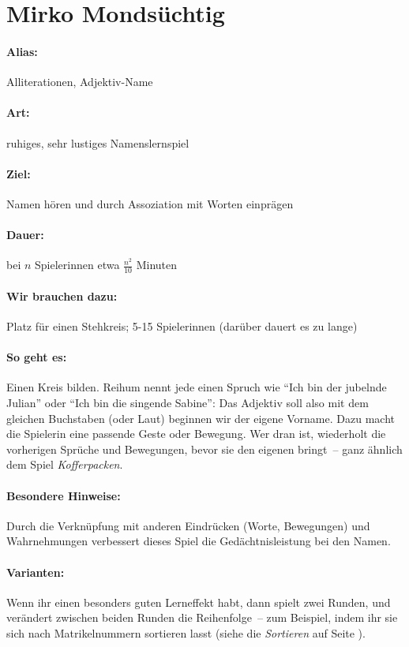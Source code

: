 \section{Mirko Mondsüchtig}
\label{mirko}
\paragraph{Alias:} Alliterationen, Adjektiv-Name
\paragraph{Art:} ruhiges, sehr lustiges Namenslernspiel
\paragraph{Ziel:} Namen hören und durch Assoziation mit Worten einprägen
\paragraph{Dauer:} bei $n$ Spielerinnen etwa $\frac{n^2}{10}$ Minuten
\paragraph{Wir brauchen dazu:} Platz für einen Stehkreis; 5-15 Spielerinnen (darüber dauert es zu lange)
\paragraph{So geht es:} Einen Kreis bilden. Reihum nennt jede einen Spruch wie "`Ich bin der jubelnde Julian"' oder "`Ich bin die singende Sabine"': Das Adjektiv soll also mit dem gleichen Buchstaben (oder Laut) beginnen wir der eigene Vorname. Dazu macht die Spielerin eine passende Geste oder Bewegung. Wer dran ist, wiederholt die vorherigen Sprüche und Bewegungen, bevor sie den eigenen bringt~-- ganz ähnlich dem Spiel \emph{Kofferpacken}.
\paragraph{Besondere Hinweise:} Durch die Verknüpfung mit anderen Eindrücken (Worte, Bewegungen) und Wahrnehmungen verbessert dieses Spiel die Gedächtnisleistung bei den Namen.
\paragraph{Varianten:} Wenn ihr einen besonders guten Lerneffekt habt, dann spielt zwei Runden, und verändert zwischen beiden Runden die Reihenfolge~-- zum Beispiel, indem ihr sie sich nach Matrikelnummern sortieren lasst (siehe die \emph{Sortieren} auf Seite \pageref{sortieren}).
